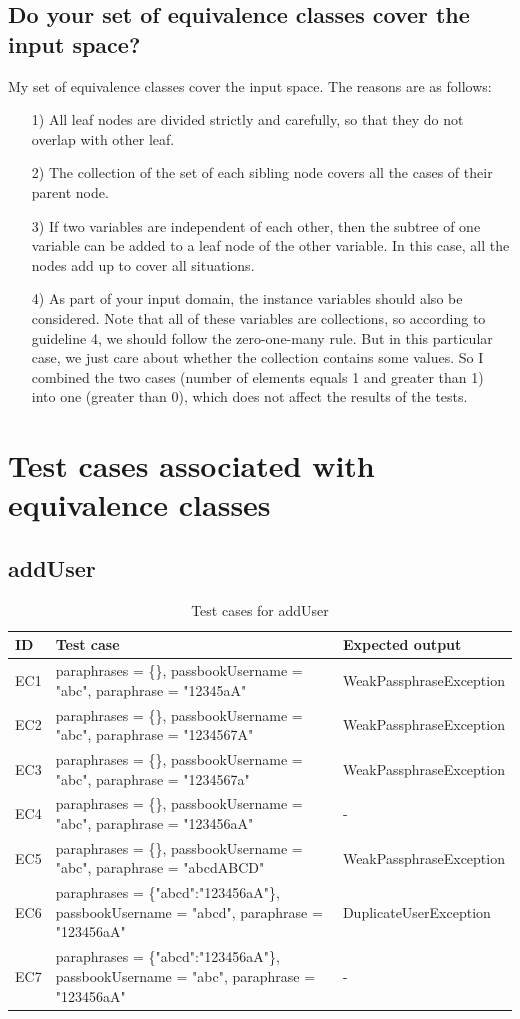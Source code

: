 \documentclass{article}
\begin{document}
\subsection{Do your set of equivalence classes cover the input space?}
My set of equivalence classes cover the input space. The reasons are as follows:
\begin{itemize}
\item [1)] All leaf nodes are divided strictly and carefully, so that they do not overlap with other leaf.
\item [2)] The collection of the set of each sibling node covers all the cases of their parent node.
\item [3)]
If two variables are independent of each other, then the subtree of one variable can be added to a leaf node of the other variable. In this case, all the nodes add up to cover all situations.
\item [4)]
As part of your input domain, the instance variables should also be considered. Note that all of these variables are collections, so according to guideline 4, we should follow the zero-one-many rule. But in this particular case, we just care about whether the collection contains some values. So I combined the two cases (number of elements equals 1 and greater than 1) into one (greater than 0), which does not affect the results of the tests.
\end{itemize}

\section{Test cases associated with equivalence classes}
\subsection{addUser}

\begin{longtable}{|p{2cm}|p{7cm}|p{5cm}|}
\caption{Test cases for addUser}\\
\hline 
ID&Test case&Expected output\\
\hline  
EC1&paraphrases = \{\}, passbookUsername = "abc", paraphrase = "12345aA"&WeakPassphraseException\\
\hline
EC2&paraphrases = \{\}, passbookUsername = "abc", paraphrase = "1234567A"&WeakPassphraseException\\
\hline
EC3&paraphrases = \{\}, passbookUsername = "abc", paraphrase = "1234567a"&WeakPassphraseException\\
\hline
EC4&paraphrases = \{\}, passbookUsername = "abc", paraphrase = "123456aA"&-\\
\hline
EC5&paraphrases = \{\}, passbookUsername = "abc", paraphrase = "abcdABCD"&WeakPassphraseException\\
\hline
EC6&paraphrases = \{"abcd":"123456aA"\}, passbookUsername = "abcd", paraphrase = "123456aA"&DuplicateUserException\\
\hline
EC7&paraphrases = \{"abcd":"123456aA"\}, passbookUsername = "abc", paraphrase = "123456aA"&-\\
\hline
\end{longtable}
\end{document}
